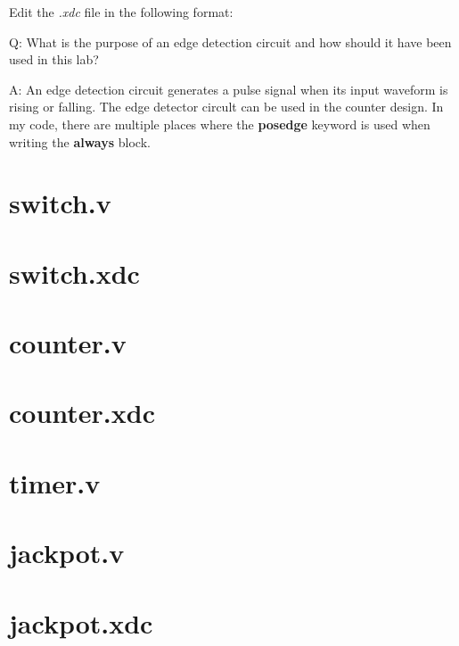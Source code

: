 \documentclass[11pt,letterpaper,titlepage]{article}
\begin{document}
Edit the \textit{.xdc} file in the following format:



Q: What is the purpose of an edge detection circuit and how should it have been used in this lab?

A: An edge detection circuit generates a pulse signal when its input waveform is rising or falling. The edge detector circult can be used in the counter design. In my code, there are multiple places where the \textbf{posedge} keyword is used when writing the \textbf{always} block.

\newpage

\begin{appendices}

\section{switch.v}
\label{appendix:verilog_switch}


\section{switch.xdc}
\label{appendix:xdc_switch}


\section{counter.v}
\label{appendix:verilog_counter}


\section{counter.xdc}
\label{appendix:xdc_counter}


\section{timer.v}
\label{appendix:verilog_timer}


\section{jackpot.v}
\label{appendix:verilog_jackpot}


\section{jackpot.xdc}
\label{appendix:xdc_jackpot}


\end{appendices} 

\end{document}
